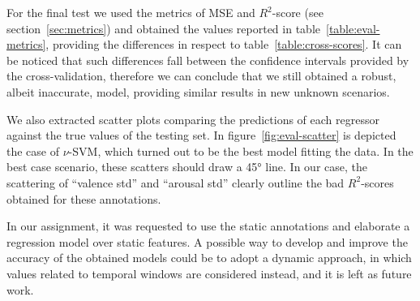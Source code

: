 For the final test we used the metrics of MSE and $R^2$-score (see section~\ref{sec:metrics}) and obtained the values reported in table~\ref{table:eval-metrics}, providing the differences in respect to table~\ref{table:cross-scores}. It can be noticed that such differences fall between the confidence intervals provided by the cross-validation, therefore we can conclude that we still obtained a robust, albeit inaccurate, model, providing similar results in new unknown scenarios.

We also extracted scatter plots comparing the predictions of each regressor against the true values of the testing set. In  figure~\ref{fig:eval-scatter} is depicted the case of $\nu$-SVM, which turned out to be the best model fitting the data. In the best case scenario, these scatters should draw a 45° line. In our case, the scattering of ``valence std'' and ``arousal std'' clearly outline the bad $R^2$-scores obtained for these annotations.

In our assignment, it was requested to use the static annotations and elaborate a regression model over static features. A possible way to develop and improve the accuracy of the obtained models could be to adopt a dynamic approach, in which values related to temporal windows are considered instead, and it is left as future work.
